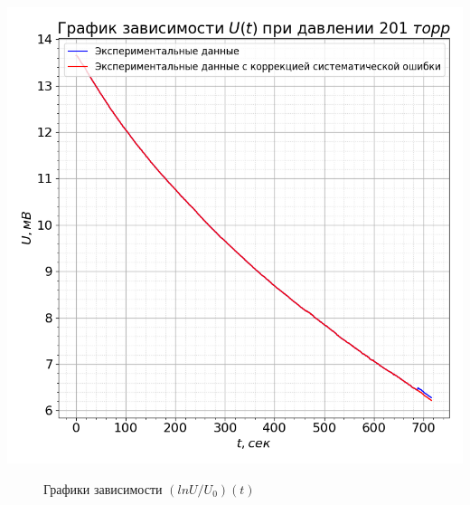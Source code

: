 \documentclass[a4paper, 12pt]{article}
\begin{document}
        \begin{minipage}{0.47\textwidth}
            \includegraphics[width=1\linewidth]{graphs/raw201.png}
        \end{minipage}

        \begin{figure}[ht]
            \caption{Графики зависимости $(ln U/U_0)(t)$}
        \end{figure}
\end{document}

